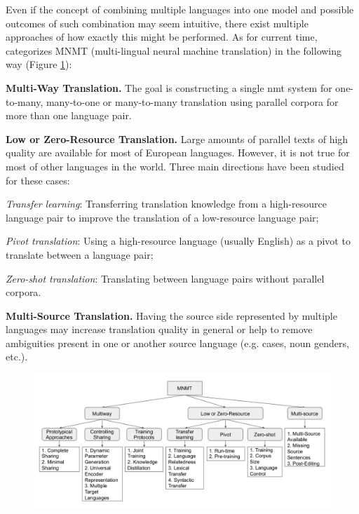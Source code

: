 Even if the concept of combining multiple languages into one model and possible outcomes
of such combination may seem intuitive, there exist multiple approaches of how exactly
this might be performed. As for current time, \cite{Dabre2019} categorizes
MNMT (multi-lingual neural machine translation) in the following way
(Figure \ref{fig:mnmt_categorized}):

\textbf{Multi-Way Translation.}
The goal is constructing a single \acrshort{nmt} system for
one-to-many, many-to-one or many-to-many
translation using parallel corpora for more than one language pair.

\textbf{Low or Zero-Resource Translation.}
Large amounts of parallel texts of high quality are available for most of European
languages. However, it is not true for most of other languages in the world.
Three main directions have been studied for these cases:


\textit{Transfer learning}: Transferring translation knowledge from a high-resource language pair
to improve the translation of a low-resource language pair;


\textit{Pivot translation}: Using a high-resource language (usually English) as a pivot to translate
between a language pair;


\textit{Zero-shot translation}: Translating between language pairs without parallel corpora.

\textbf{Multi-Source Translation.} Having the source side represented by multiple languages
may increase translation quality in general or help to remove ambiguities present in one or another
source language (e.g. cases, noun genders, etc.).


\begin{figure}[h]
	\begin{minipage}{0.9\textwidth}
	\centering
	\includegraphics[width=1.0\columnwidth]{img/dabre_2019_mnmt_categorized.png}
	\end{minipage}\hfill
	\label{fig:mnmt_categorized}
\end{figure}


